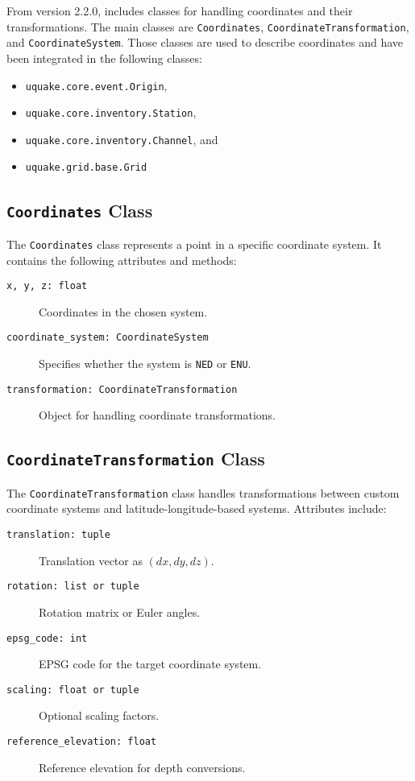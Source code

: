 \label{app:coordinate_system_handling}

From version 2.2.0, \muquake includes classes for handling coordinates and their transformations. The main classes are \texttt{Coordinates}, \texttt{CoordinateTransformation}, and \texttt{CoordinateSystem}. Those classes are used to describe coordinates and have been integrated in the following classes: 

\begin{itemize}
\item \texttt{uquake.core.event.Origin}, 
\item \texttt{uquake.core.inventory.Station}, 
\item \texttt{uquake.core.inventory.Channel}, and
\item \texttt{uquake.grid.base.Grid}
\end{itemize}

\subsection{\texttt{Coordinates} Class}
The \texttt{Coordinates} class represents a point in a specific coordinate system. It contains the following attributes and methods:

\begin{description}
    \item[\texttt{x, y, z: float}] Coordinates in the chosen system.
    \item[\texttt{coordinate\_system: CoordinateSystem}] Specifies whether the system is \texttt{NED} or \texttt{ENU}.
    \item[\texttt{transformation: CoordinateTransformation}] Object for handling coordinate transformations.
\end{description}

\subsection{\texttt{CoordinateTransformation} Class}
The \texttt{CoordinateTransformation} class handles transformations between custom coordinate systems and latitude-longitude-based systems. Attributes include:

\begin{description}
    \item[\texttt{translation: tuple}] Translation vector as \((dx, dy, dz)\).
    \item[\texttt{rotation: list or tuple}] Rotation matrix or Euler angles.
    \item[\texttt{epsg\_code: int}] EPSG code for the target coordinate system.
    \item[\texttt{scaling: float or tuple}] Optional scaling factors.
    \item[\texttt{reference\_elevation: float}] Reference elevation for depth conversions.
\end{description}

